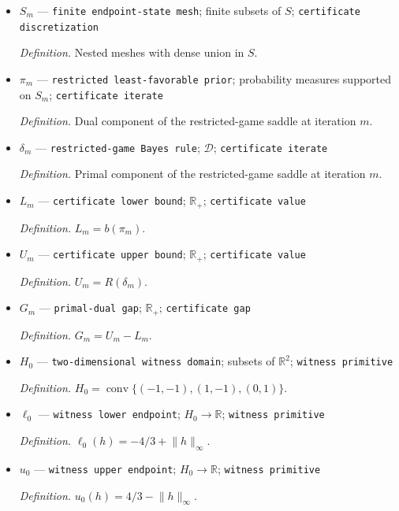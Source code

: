 \documentclass{article}
\begin{document}
\begin{itemize}
  \par\smallskip\noindent\emph{Definition.} Rational number used to close the certified primal-dual inequality \(R(\delta_{\pi})\le q\le b(\pi)\).
  \item \(S_m\) --- \texttt{finite endpoint-\allowbreak{}state mesh}; finite subsets of \(S\); \texttt{certificate discretization}
  \par\smallskip\noindent\emph{Definition.} Nested meshes with dense union in \(S\).
  \item \(\pi_m\) --- \texttt{restricted least-\allowbreak{}favorable prior}; probability measures supported on \(S_m\); \texttt{certificate iterate}
  \par\smallskip\noindent\emph{Definition.} Dual component of the restricted-game saddle at iteration \(m\).
  \item \(\delta_m\) --- \texttt{restricted-\allowbreak{}game Bayes rule}; \(\mathcal D\); \texttt{certificate iterate}
  \par\smallskip\noindent\emph{Definition.} Primal component of the restricted-game saddle at iteration \(m\).
  \item \(L_m\) --- \texttt{certificate lower bound}; \(\mathbb R_{+}\); \texttt{certificate value}
  \par\smallskip\noindent\emph{Definition.} \(L_m=b(\pi_m)\).
  \item \(U_m\) --- \texttt{certificate upper bound}; \(\mathbb R_{+}\); \texttt{certificate value}
  \par\smallskip\noindent\emph{Definition.} \(U_m=R(\delta_m)\).
  \item \(G_m\) --- \texttt{primal-\allowbreak{}dual gap}; \(\mathbb R_{+}\); \texttt{certificate gap}
  \par\smallskip\noindent\emph{Definition.} \(G_m=U_m-L_m\).
  \item \(H_0\) --- \texttt{two-\allowbreak{}dimensional witness domain}; subsets of \(\mathbb R^2\); \texttt{witness primitive}
  \par\smallskip\noindent\emph{Definition.} \(H_0=\operatorname{conv}\{(-1,-1),(1,-1),(0,1)\}\).
  \item \(\ell_0\) --- \texttt{witness lower endpoint}; \(H_0\to\mathbb R\); \texttt{witness primitive}
  \par\smallskip\noindent\emph{Definition.} \(\ell_0(h)=-4/3+\lVert h\rVert_{\infty}\).
  \item \(u_0\) --- \texttt{witness upper endpoint}; \(H_0\to\mathbb R\); \texttt{witness primitive}
  \par\smallskip\noindent\emph{Definition.} \(u_0(h)=4/3-\lVert h\rVert_{\infty}\).

\end{itemize}
\end{document}
